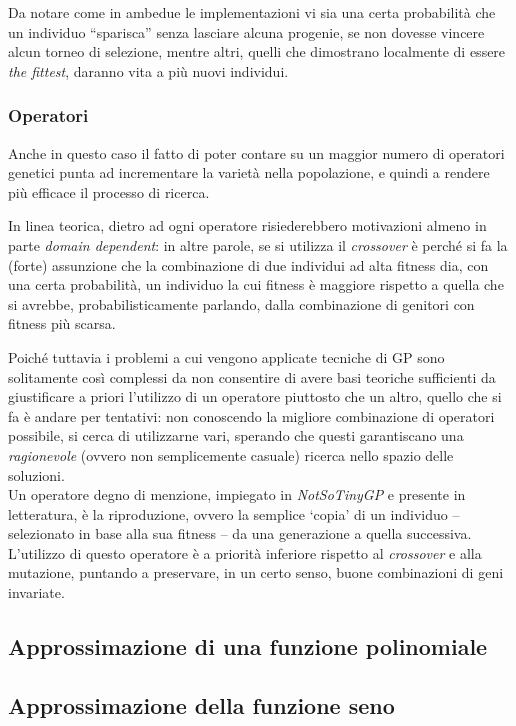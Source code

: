 \documentclass{../llncs}
\begin{document}
Da notare come in ambedue le implementazioni vi sia una certa probabilità che un individuo ``sparisca'' senza lasciare alcuna progenie, se non dovesse vincere alcun torneo di selezione, mentre altri, quelli che dimostrano localmente di essere \emph{the fittest}, daranno vita a più nuovi individui.

\subsubsection{Operatori}
Anche in questo caso il fatto di poter contare su un maggior numero di operatori genetici punta ad incrementare la varietà nella popolazione, e quindi a rendere più efficace il processo di ricerca.

In linea teorica, dietro ad ogni operatore risiederebbero motivazioni almeno in parte \emph{domain dependent}: in altre parole, se si utilizza il \emph{crossover} è perché si fa la (forte) assunzione che la combinazione di due individui ad alta fitness dia, con una certa probabilità, un individuo la cui fitness è maggiore rispetto a quella che si avrebbe, probabilisticamente parlando, dalla combinazione di genitori con fitness più scarsa.

Poiché tuttavia i problemi a cui vengono applicate tecniche di GP sono solitamente così complessi da non consentire di avere basi teoriche sufficienti da giustificare a priori l'utilizzo di un operatore piuttosto che un altro, quello che si fa è andare per tentativi: non conoscendo la migliore combinazione di operatori possibile, si cerca di utilizzarne vari, sperando che questi garantiscano una \emph{ragionevole} (ovvero non semplicemente casuale) ricerca nello spazio delle soluzioni.\\

Un operatore degno di menzione, impiegato in \emph{NotSoTinyGP} e presente in letteratura, è la riproduzione, ovvero la semplice `copia' di un individuo -- selezionato in base alla sua fitness -- da una generazione a quella successiva. L'utilizzo di questo operatore è a priorità inferiore rispetto al \emph{crossover} e alla mutazione, puntando a preservare, in un certo senso, buone combinazioni di geni invariate.

\subsection{Approssimazione di una funzione polinomiale}
\subsection{Approssimazione della funzione seno}
\end{document}
